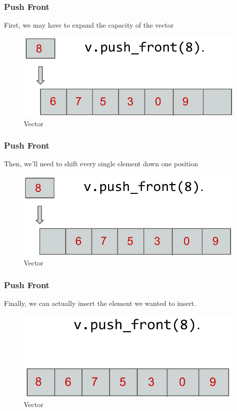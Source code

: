 \documentclass{beamer}
\newtheorem{Key points}{Key points}
\begin{document}
\begin{frame}
  \frametitle{Push Front}
  First, we may have to expand the capacity of
the vector
\begin{figure}
  \centering
        \includegraphics[width=0.7\columnwidth]{vec3.png} 
  \caption{Vector }
\end{figure}
\end{frame}

\begin{frame}
  \frametitle{Push Front}
Then, we'll need to shift every single element
down one position
\begin{figure}
  \centering
        \includegraphics[width=0.7\columnwidth]{vec4.png} 
  \caption{Vector }
\end{figure}
\end{frame}

\begin{frame}
  \frametitle{Push Front}
Finally, we can actually insert the element we
wanted to insert.

\begin{figure}
  \centering
        \includegraphics[width=0.7\columnwidth]{vec5.png} 
  \caption{Vector }
\end{figure}
\end{frame}



\end{document}
